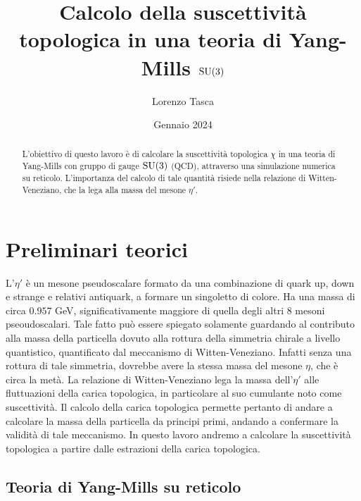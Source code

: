 \documentclass{article}
\numberwithin{equation}{subsection}
\begin{document}
\author{Lorenzo Tasca}
\title{Calcolo della suscettività topologica in una teoria di Yang-Mills $\textup{SU}(3)$}
\date{Gennaio 2024}
\maketitle

\begin{abstract}
    L'obiettivo di questo lavoro è di calcolare la suscettività topologica $\chi$ in una teoria di Yang-Mills con gruppo di gauge $\textup{SU}(3)$ (QCD), attraverso una simulazione numerica su reticolo. L'importanza del calcolo di tale quantità risiede nella relazione di Witten-Veneziano, che la lega alla massa del mesone $\eta'$. 
\end{abstract} 
\tableofcontents


\section{Preliminari teorici}

L'$\eta'$ è un mesone pseudoscalare formato da una combinazione di quark up, down e strange e relativi antiquark, a formare un singoletto di colore. Ha una massa di circa $0.957$ GeV, significativamente maggiore di quella degli altri 8 mesoni pseoudoscalari. Tale fatto può essere spiegato solamente guardando al contributo alla massa della particella dovuto alla rottura della simmetria chirale a livello quantistico, quantificato dal meccanismo di Witten-Veneziano. Infatti senza una rottura di tale simmetria, dovrebbe avere la stessa massa del mesone $\eta$, che è circa la metà. La relazione di Witten-Veneziano lega la massa dell'$\eta'$ alle fluttuazioni della carica topologica, in particolare al suo cumulante noto come suscettività. Il calcolo della carica topologica permette pertanto di andare a calcolare la massa della particella da principi primi, andando a confermare la validità di tale meccanismo. In questo lavoro andremo a calcolare la suscettività topologica a partire dalle estrazioni della carica topologica.

\subsection{Teoria di Yang-Mills su reticolo}
\end{document}

